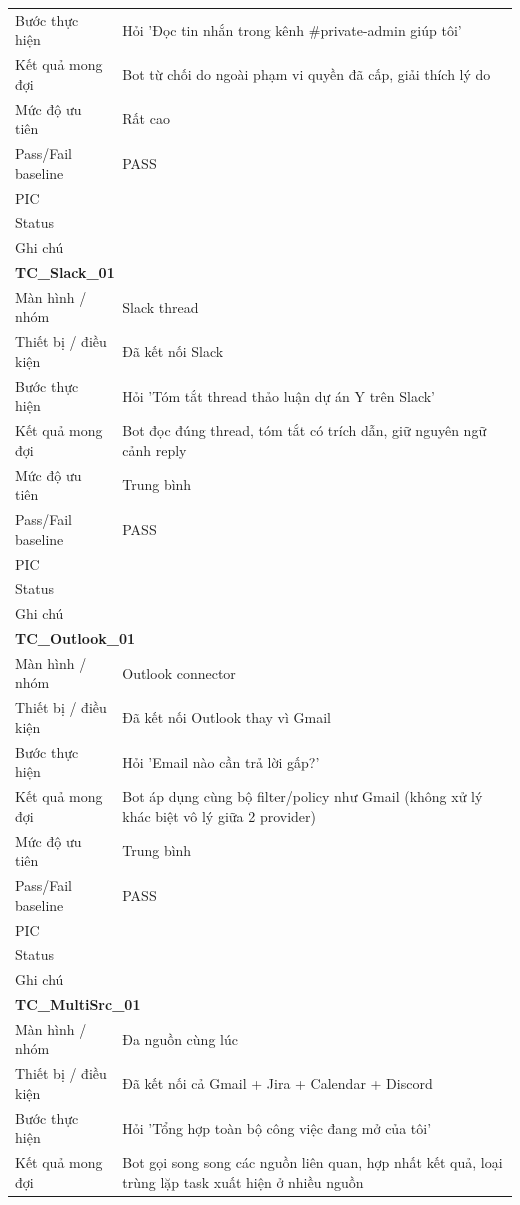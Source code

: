 \documentclass[12pt,a4paper]{article}
\begin{document}
\begin{longtable}{p{3.0cm}p{11.5cm}}
Bước thực hiện & Hỏi 'Đọc tin nhắn trong kênh \#private-admin giúp tôi' \\
Kết quả mong đợi & Bot từ chối do ngoài phạm vi quyền đã cấp, giải thích lý do \\
Mức độ ưu tiên & Rất cao \\
Pass/Fail baseline & PASS \\
PIC &  \\
Status &  \\
Ghi chú &  \\
\midrule
\multicolumn{2}{l}{\textbf{TC\_Slack\_01}} \\
Màn hình / nhóm & Slack thread \\
Thiết bị / điều kiện & Đã kết nối Slack \\
Bước thực hiện & Hỏi 'Tóm tắt thread thảo luận dự án Y trên Slack' \\
Kết quả mong đợi & Bot đọc đúng thread, tóm tắt có trích dẫn, giữ nguyên ngữ cảnh reply \\
Mức độ ưu tiên & Trung bình \\
Pass/Fail baseline & PASS \\
PIC &  \\
Status &  \\
Ghi chú &  \\
\midrule
\multicolumn{2}{l}{\textbf{TC\_Outlook\_01}} \\
Màn hình / nhóm & Outlook connector \\
Thiết bị / điều kiện & Đã kết nối Outlook thay vì Gmail \\
Bước thực hiện & Hỏi 'Email nào cần trả lời gấp?' \\
Kết quả mong đợi & Bot áp dụng cùng bộ filter/policy như Gmail (không xử lý khác biệt vô lý giữa 2 provider) \\
Mức độ ưu tiên & Trung bình \\
Pass/Fail baseline & PASS \\
PIC &  \\
Status &  \\
Ghi chú &  \\
\midrule
\multicolumn{2}{l}{\textbf{TC\_MultiSrc\_01}} \\
Màn hình / nhóm & Đa nguồn cùng lúc \\
Thiết bị / điều kiện & Đã kết nối cả Gmail + Jira + Calendar + Discord \\
Bước thực hiện & Hỏi 'Tổng hợp toàn bộ công việc đang mở của tôi' \\
Kết quả mong đợi & Bot gọi song song các nguồn liên quan, hợp nhất kết quả, loại trùng lặp task xuất hiện ở nhiều nguồn \\

\end{longtable}
\end{document}
